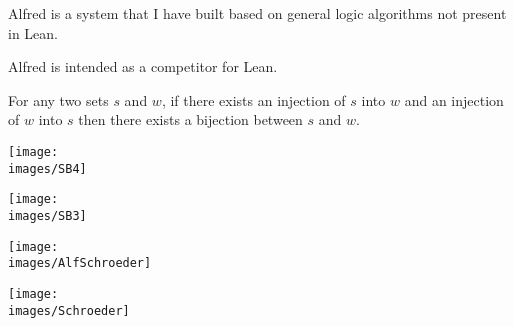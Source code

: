 {\vfill
Alfred is a system that I have built based on general logic algorithms not present in Lean.

\vfill
Alfred is intended as a competitor for Lean.


For any two sets $s$ and $w$, if there exists an injection of $s$ into $w$ and an injection of $w$ into $s$ then there exists a bijection between $s$ and $w$.


\centerline{\texttt{[image: \\images/SB4]}}


\centerline{\texttt{[image: \\images/SB3]}}



\centerline{\texttt{[image: \\images/AlfSchroeder]}}


\centerline{\texttt{[image: \\images/Schroeder]}}


}




